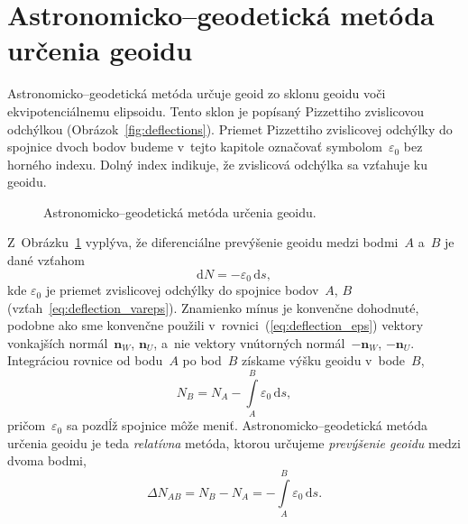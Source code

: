 \documentclass[a4paper, 12pt]{book}
\newcommand{\diff}{\mathrm d}
\let\vec\mathbf
\begin{document}
\section{Astronomicko--geodetická metóda určenia geoidu}
\label{sec:geoid_astrogeodetic}

Astronomicko--geodetická metóda určuje geoid zo sklonu geoidu voči 
ekvipotenciálnemu elipsoidu.  Tento sklon je popísaný Pizzettiho zvislicovou 
odchýlkou (Obrázok~\ref{fig:deflections}).  Priemet Pizzettiho zvislicovej 
odchýlky do spojnice dvoch bodov budeme v~tejto kapitole označovať 
symbolom~$\varepsilon_0$ bez horného indexu.  Dolný index indikuje, že 
zvislicová odchýlka sa vzťahuje ku geoidu.

\begin{figure}[bt]
\centering

\caption{Astronomicko--geodetická metóda určenia geoidu.}
\label{fig:astrogeodetic_method}
\end{figure}

Z~Obrázku~\ref{fig:astrogeodetic_method} vyplýva, že diferenciálne prevýšenie 
geoidu medzi bodmi~$A$ a~$B$ je dané vzťahom \parencite{MoritzPhysicalGeodesy}
%
\begin{equation}
\label{eq:N_deflections}
\diff N = -\varepsilon_0 \, \diff s{,}
\end{equation}
%
kde $\varepsilon_0$ je priemet zvislicovej odchýlky do spojnice bodov~$A$, $B$ 
(vzťah~\ref{eq:deflection_vareps}).  Znamienko mínus je konvenčne dohodnuté, 
podobne ako sme konvenčne použili v~rovnici~(\ref{eq:deflection_eps}) vektory 
vonkajších normál~$\vec n_W$, $\vec n_U$, a~nie vektory vnútorných 
normál~$-\vec n_W$, $-\vec n_U$.  Integráciou rovnice od bodu~$A$ po bod~$B$ 
získame výšku geoidu v~bode~$B$,
%
\begin{equation}
\label{eq:N_deflections_nb}
N_B = N_A - \int\limits_A^B \varepsilon_0 \, \diff s{,}
\end{equation}
%
pričom~$\varepsilon_0$ sa pozdĺž spojnice môže meniť.  Astronomicko--geodetická 
metóda určenia geoidu je teda \emph{relatívna} metóda, ktorou určujeme 
\emph{prevýšenie geoidu} medzi dvoma bodmi,
%
\begin{equation}
\label{eq:N_deflections_delta}
\Delta N_{AB} = N_B - N_A = - \int\limits_A^B \varepsilon_0 \, \diff s{.}
\end{equation}
\end{document}
